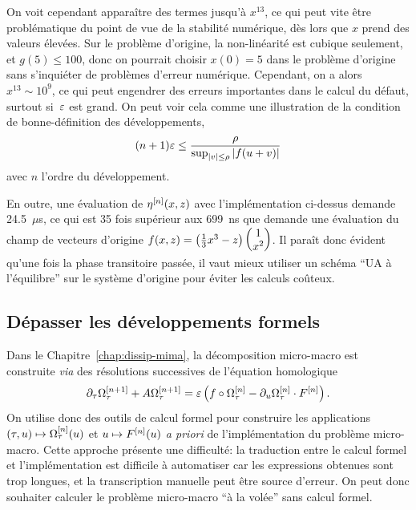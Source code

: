 On voit cependant apparaître des termes jusqu'à $x^{13}$, ce qui peut vite être problématique du point de vue de la stabilité numérique, dès lors que $x$ prend des valeurs élevées. Sur le problème d'origine, la non-linéarité est cubique seulement, et $g(5) \leq 100$, donc on pourrait choisir $x(0) = 5$ dans le problème d'origine sans s'inquiéter de problèmes d'erreur numérique. Cependant, on a alors $x^{13} \sim 10^9$, ce qui peut engendrer des erreurs importantes dans le calcul du défaut, surtout si~$\varepsilon$ est grand. On peut voir cela comme une illustration de la condition de bonne-définition des développements, 
\begin{equation*}
    (n+1) \varepsilon \leq \frac{\rho}{\sup_{|v| \leq \rho} |f(u+v)|}
\end{equation*}
avec $n$ l'ordre du développement. 

En outre, une évaluation de $\eta^{[n]} (x,z)$ avec l'implémentation ci-dessus demande 24.5~$\mu$s, ce qui est 35 fois supérieur aux 699~ns que demande une évaluation du champ de vecteurs d'origine $f(x,z) = \left(\frac{1}{3}x^3 - z \right) \begin{pmatrix} 1 \\ x^2 \end{pmatrix}$. Il paraît donc évident qu'une fois la phase transitoire passée, il vaut mieux utiliser un schéma \enquote{UA à l'équilibre} sur le système d'origine pour éviter les calculs coûteux.



\subsection{Dépasser les développements formels}

Dans le Chapitre~\ref{chap:dissip-mima}, la décomposition micro-macro est construite \textit{via} des résolutions successives de l'équation homologique
\begin{equation}
    \partial_\tau \Omega^{[n+1]} _\tau + A\Omega^{[n+1]} _\tau
    = \varepsilon \left( 
        f \circ \Omega^{[n]} _\tau 
        - \partial_u \Omega^{[n]} _\tau \cdot F^{[n]} 
    \right) .
\end{equation}
On utilise donc des outils de calcul formel pour construire les applications~$(\tau, u) \mapsto \Omega^{[n]} _\tau(u)$ et $u \mapsto F^{[n]} (u)$ \textit{a priori} de l'implémentation du problème micro-macro. Cette approche présente une difficulté: la traduction entre le calcul formel et l'implémentation est difficile à automatiser car les expressions obtenues sont trop longues, et la transcription manuelle peut être source d'erreur. On peut donc souhaiter calculer le problème micro-macro \enquote{à la volée} sans calcul formel. 

